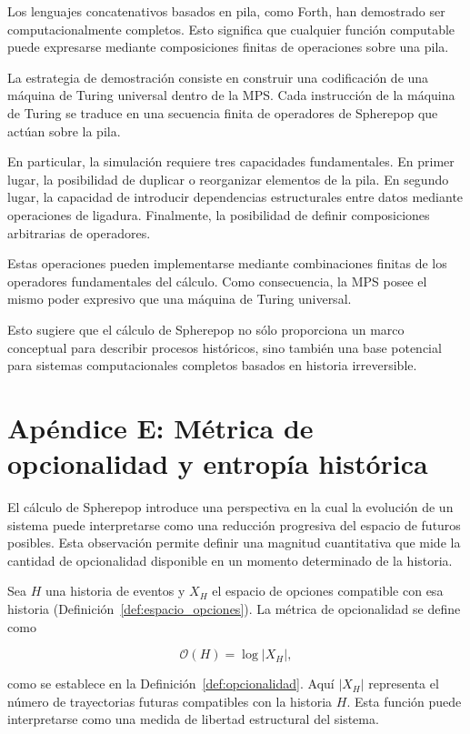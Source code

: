 \documentclass[12pt]{article}
\theoremstyle{plain}
\theoremstyle{definition}
\begin{document}
Los lenguajes concatenativos basados en pila, como Forth, han demostrado ser computacionalmente completos. Esto significa que cualquier función computable puede expresarse mediante composiciones finitas de operaciones sobre una pila.

La estrategia de demostración consiste en construir una codificación de una máquina de Turing universal dentro de la MPS. Cada instrucción de la máquina de Turing se traduce en una secuencia finita de operadores de Spherepop que actúan sobre la pila.

En particular, la simulación requiere tres capacidades fundamentales. En primer lugar, la posibilidad de duplicar o reorganizar elementos de la pila. En segundo lugar, la capacidad de introducir dependencias estructurales entre datos mediante operaciones de ligadura. Finalmente, la posibilidad de definir composiciones arbitrarias de operadores.

Estas operaciones pueden implementarse mediante combinaciones finitas de los operadores fundamentales del cálculo. Como consecuencia, la MPS posee el mismo poder expresivo que una máquina de Turing universal.

Esto sugiere que el cálculo de Spherepop no sólo proporciona un marco conceptual para describir procesos históricos, sino también una base potencial para sistemas computacionales completos basados en historia irreversible.

\section{Apéndice E: Métrica de opcionalidad y entropía histórica}
\label{ap:opcionalidad}

El cálculo de Spherepop introduce una perspectiva en la cual la evolución de un sistema puede interpretarse como una reducción progresiva del espacio de futuros posibles. Esta observación permite definir una magnitud cuantitativa que mide la cantidad de opcionalidad disponible en un momento determinado de la historia.

Sea $H$ una historia de eventos y $X_H$ el espacio de opciones compatible con esa historia (Definición~\ref{def:espacio_opciones}). La métrica de opcionalidad se define como

\[
\mathcal{O}(H) = \log |X_H|,
\]

como se establece en la Definición~\ref{def:opcionalidad}. Aquí $|X_H|$ representa el número de trayectorias futuras compatibles con la historia $H$. Esta función puede interpretarse como una medida de libertad estructural del sistema.
\end{document}
